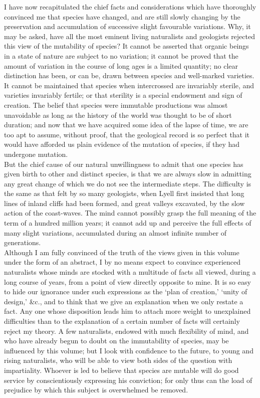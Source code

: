 \indent I have now recapitulated the chief facts and considerations which have thoroughly convinced me that species have changed, and are still slowly changing by the preservation and accumulation of successive slight favourable variations. Why, it may be asked, have all the most eminent living naturalists and geologists rejected this view of the mutability of species? It cannot be asserted that organic beings in a state of nature are subject to no variation; it cannot be proved that the amount of variation in the course of long ages is a limited quantity; no clear distinction has been, or can be, drawn between species and well-marked varieties.  It cannot be maintained that species when intercrossed are invariably sterile, and varieties invariably fertile; or that sterility is a special endowment and sign of creation. The belief that species were immutable productions was almost unavoidable as long as the history of the world was thought to be of short duration; and now that we have acquired some idea of the lapse of time, we are too apt to assume, without proof, that the geological record is so perfect that it would have afforded us plain evidence of the mutation of species, if they had undergone mutation.~\\
\indent But the chief cause of our natural unwillingness to admit that one species has given birth to other and distinct species, is that we are always slow in admitting any great change of which we do not see the intermediate steps. The difficulty is the same as that felt by so many geologists, when Lyell first insisted that long lines of inland cliffs had been formed, and great valleys excavated, by the slow action of the coast-waves.  The mind cannot possibly grasp the full meaning of the term of a hundred million years; it cannot add up and perceive the full effects of many slight variations, accumulated during an almost infinite number of generations.~\\
\indent Although I am fully convinced of the truth of the views given in this volume under the form of an abstract, I by no means expect to convince experienced naturalists whose minds are stocked with a multitude of facts all viewed, during a long course of years, from a point of view directly opposite to mine. It is so easy to hide our ignorance under such expressions as the `plan of creation,' `unity of design,' \&c., and to think that we give an explanation when we only restate a fact. Any one whose disposition leads him to attach more weight to unexplained difficulties than to the explanation of a certain number of facts will certainly reject my theory. A few naturalists, endowed with much flexibility of mind, and who have already begun to doubt on the immutability of species, may be influenced by this volume; but I look with confidence to the future, to young and rising naturalists, who will be able to view both sides of the question with impartiality. Whoever is led to believe that species are mutable will do good service by conscientiously expressing his conviction; for only thus can the load of prejudice by which this subject is overwhelmed be removed.~\\
